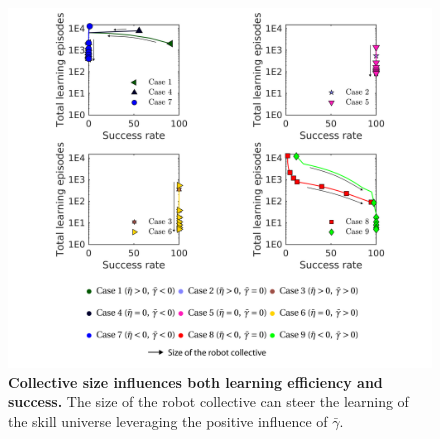 \documentclass[12pt]{article}
\begin{document}
\begin{figure}[t!]
	\centering
	\hspace*{\fill}
	\includegraphics[width=14cm]{cases_point_plot.png}
	\hspace*{\fill}
	\caption[] {\label{fig:cases_point_plot} \textbf{Collective size influences both learning efficiency and success.} The size of the robot collective can steer the learning of the skill universe leveraging the positive influence of $\bar{\gamma}$.}
\end{figure}
\end{document}

